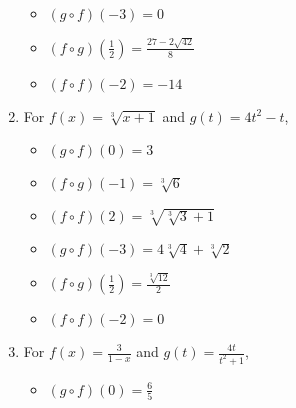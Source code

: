 \begin{enumerate}
\begin{multicols}{3}
\begin{itemize}
\item  $(g\circ f)(-3) = 0$

\item  $(f\circ g)\left(\frac{1}{2}\right) = \frac{27-2\sqrt{42}}{8}$

\item  $(f \circ f)(-2) = -14$

\end{itemize}

\end{multicols}

\newpage

\item  For  $f(x) = \sqrt[3]{x+1}$ and $g(t) = 4t^2-t$,
\begin{multicols}{3}

\begin{itemize}

\item  $(g\circ f)(0) = 3$

\item  $(f\circ g)(-1) = \sqrt[3]{6}$

\item  $(f \circ f)(2) = \sqrt[3]{\sqrt[3]{3}+1}$

\end{itemize}

\end{multicols}

\begin{multicols}{3}

\begin{itemize}

\item  $(g\circ f)(-3) = 4\sqrt[3]{4}+\sqrt[3]{2}$

\item  $(f\circ g)\left(\frac{1}{2}\right) = \frac{\sqrt[3]{12}}{2}$

\item  $(f \circ f)(-2) = 0$

\end{itemize}

\end{multicols}

\item  For  $f(x) = \frac{3}{1-x}$ and $g(t) = \frac{4t}{t^2+1}$,
\begin{multicols}{3}

\begin{itemize}

\item  $(g\circ f)(0) = \frac{6}{5}$


\end{itemize}
\end{multicols}
\end{enumerate}
